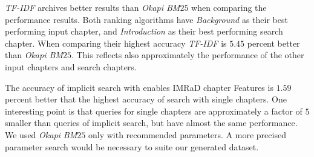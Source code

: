 \textit{TF-IDF} archives better results than \textit{Okapi BM$25$} when comparing the performance results. Both ranking algorithms have \textit{Background} as their best performing input chapter, and \textit{Introduction} as their best performing search chapter. When comparing their highest accuracy \textit{TF-IDF} is $5.45$ percent better than \textit{Okapi BM$25$}. This reflects also approximately the performance of the other input chapters and search chapters.

The accuracy of implicit search with enables IMRaD chapter Features is $1.59$ percent better that the highest accuracy of search with single chapters. One interesting point is that queries for single chapters are approximately a factor of $5$ smaller than queries of implicit search, but have almost the same performance. We used \textit{Okapi BM$25$} only with recommended parameters. A more precised parameter search would be necessary to suite our generated dataset.